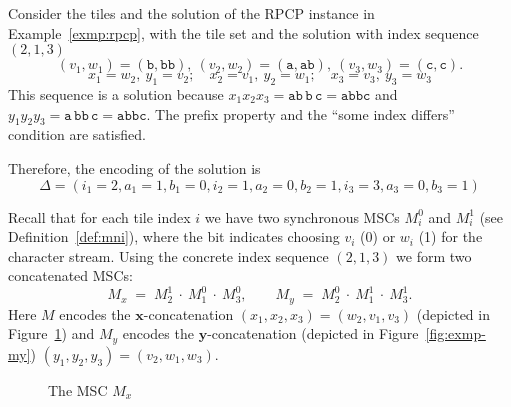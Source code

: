 \begin{example}
Consider the tiles and the solution of the RPCP instance 
in Example~\ref{exmp:rpcp}, with the tile set and the solution
with index sequence $(2,1,3)$
$$
 (v_1,w_1)=(\texttt{b},\texttt{bb}),\ 
 (v_2,w_2)=(\texttt{a},\texttt{ab}),\ 
 (v_3,w_3)=(\texttt{c},\texttt{c}).
$$
$$
 x_1=w_2,\ y_1=v_2;\quad x_2=v_1,\ y_2=w_1;\quad x_3=v_3,\ y_3=w_3
$$
This sequence is a solution because
$x_1x_2x_3=\texttt{ab}\,\texttt{b}\,\texttt{c}=\texttt{abbc}$ and
$y_1y_2y_3=\texttt{a}\,\texttt{bb}\,\texttt{c}=\texttt{abbc}$. The
prefix property and the ``some index differs'' condition are satisfied.

Therefore, the encoding of the solution is
$$\Delta = (i_1=2,a_1=1,b_1=0,i_2=1,a_2=0,b_2=1,i_3=3,a_3=0,b_3=1)$$

Recall that for each tile index \(i\) we have two synchronous MSCs
\(M_i^0\) and \(M_i^1\) (see Definition~\ref{def:mni}), where the bit
indicates choosing \(v_i\) (0) or \(w_i\) (1) for the character stream.
Using the concrete index sequence \((2,1,3)\) we form two
concatenated MSCs:
\[
  M_x\;=\; M^{1}_{2}\ \cdot\ M^{0}_{1}\ \cdot\ M^{0}_{3},
\qquad
  M_y\;=\; M^{0}_{2}\ \cdot\ M^{1}_{1}\ \cdot\ M^{1}_{3}.
\]
Here \(M\) encodes the \(\mathbf{x}\)-concatenation
\((x_1,x_2,x_3)=(w_2,v_1,v_3)\) (depicted 
in Figure~\ref{fig:exmp-mx}) and \(M_y\) encodes 
the \(\mathbf{y}\)-concatenation (depicted in 
Figure~\ref{fig:exmp-my}) \((y_1,y_2,y_3)=(v_2,w_1,w_3)\).

\begin{figure}[!ht]
\centering
\begin{msc}[draw frame=none, draw head=none, msc keyword=, head height=0px, label distance=0.5ex, foot height=0px, foot distance=0px]{}
	\declinst{P2}{P2}{}



\end{msc}
\caption{The MSC $M_x$}
\label{fig:exmp-mx}
\end{figure}


\end{example}
